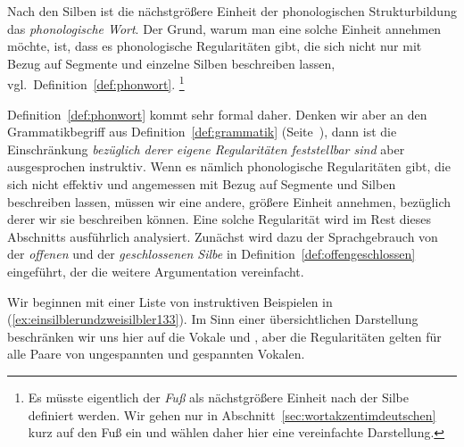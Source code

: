 
Nach den Silben ist die nächstgrößere Einheit der phonologischen Strukturbildung das \textit{phonologische Wort}.
Der Grund, warum man eine solche Einheit annehmen möchte, ist, dass es phonologische Regularitäten gibt, die sich nicht nur mit Bezug auf Segmente und einzelne Silben beschreiben lassen, vgl.\ Definition~\ref{def:phonwort}.%
\footnote{Es müsste eigentlich der \textit{Fuß} als nächstgrößere Einheit nach der Silbe definiert werden.
Wir gehen nur in Abschnitt~\ref{sec:wortakzentimdeutschen} kurz auf den Fuß ein und wählen daher hier eine vereinfachte Darstellung.}


Definition~\ref{def:phonwort} kommt sehr formal daher.
Denken wir aber an den Grammatikbegriff aus Definition~\ref{def:grammatik} (Seite~\pageref{def:grammatik}), dann ist die Einschränkung \textit{bezüglich derer eigene Regularitäten feststellbar sind} aber ausgesprochen instruktiv.
Wenn es nämlich phonologische Regularitäten gibt, die sich nicht effektiv und angemessen mit Bezug auf Segmente und Silben beschreiben lassen, müssen wir eine andere, größere Einheit annehmen, bezüglich derer wir sie beschreiben können.
Eine solche Regularität wird im Rest dieses Abschnitts ausführlich analysiert.
Zunächst wird dazu der Sprachgebrauch von der \textit{offenen} und der \textit{geschlossenen Silbe} in Definition~\ref{def:offengeschlossen} eingeführt, der die weitere Argumentation vereinfacht.


Wir beginnen mit einer Liste von instruktiven Beispielen in (\ref{ex:einsilblerundzweisilbler133}). 
Im Sinn einer übersichtlichen Darstellung beschränken wir uns hier auf die Vokale \textipa{[I]} und \textipa{[i]}, aber die Regularitäten gelten für alle Paare von ungespannten und gespannten Vokalen.


